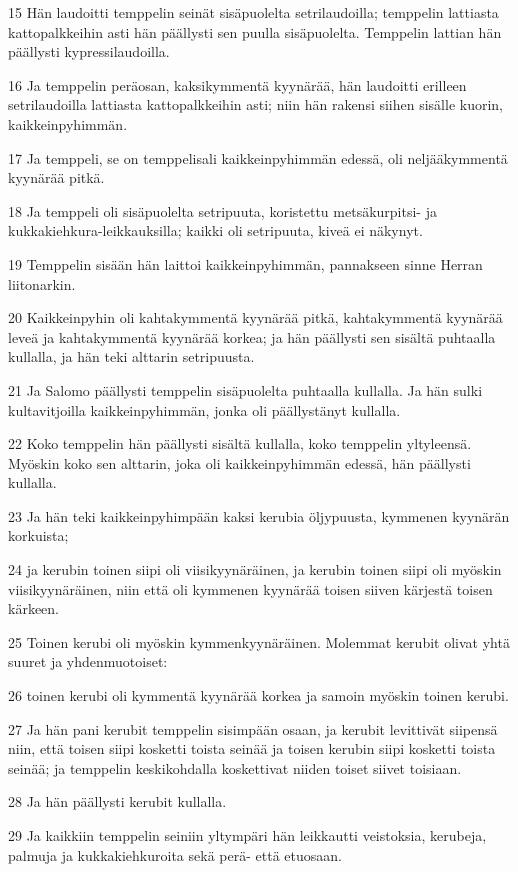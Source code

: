 \par 15 Hän laudoitti temppelin seinät sisäpuolelta setrilaudoilla; temppelin lattiasta kattopalkkeihin asti hän päällysti sen puulla sisäpuolelta. Temppelin lattian hän päällysti kypressilaudoilla.
\par 16 Ja temppelin peräosan, kaksikymmentä kyynärää, hän laudoitti erilleen setrilaudoilla lattiasta kattopalkkeihin asti; niin hän rakensi siihen sisälle kuorin, kaikkeinpyhimmän.
\par 17 Ja temppeli, se on temppelisali kaikkeinpyhimmän edessä, oli neljääkymmentä kyynärää pitkä.
\par 18 Ja temppeli oli sisäpuolelta setripuuta, koristettu metsäkurpitsi- ja kukkakiehkura-leikkauksilla; kaikki oli setripuuta, kiveä ei näkynyt.
\par 19 Temppelin sisään hän laittoi kaikkeinpyhimmän, pannakseen sinne Herran liitonarkin.
\par 20 Kaikkeinpyhin oli kahtakymmentä kyynärää pitkä, kahtakymmentä kyynärää leveä ja kahtakymmentä kyynärää korkea; ja hän päällysti sen sisältä puhtaalla kullalla, ja hän teki alttarin setripuusta.
\par 21 Ja Salomo päällysti temppelin sisäpuolelta puhtaalla kullalla. Ja hän sulki kultavitjoilla kaikkeinpyhimmän, jonka oli päällystänyt kullalla.
\par 22 Koko temppelin hän päällysti sisältä kullalla, koko temppelin yltyleensä. Myöskin koko sen alttarin, joka oli kaikkeinpyhimmän edessä, hän päällysti kullalla.
\par 23 Ja hän teki kaikkeinpyhimpään kaksi kerubia öljypuusta, kymmenen kyynärän korkuista;
\par 24 ja kerubin toinen siipi oli viisikyynäräinen, ja kerubin toinen siipi oli myöskin viisikyynäräinen, niin että oli kymmenen kyynärää toisen siiven kärjestä toisen kärkeen.
\par 25 Toinen kerubi oli myöskin kymmenkyynäräinen. Molemmat kerubit olivat yhtä suuret ja yhdenmuotoiset:
\par 26 toinen kerubi oli kymmentä kyynärää korkea ja samoin myöskin toinen kerubi.
\par 27 Ja hän pani kerubit temppelin sisimpään osaan, ja kerubit levittivät siipensä niin, että toisen siipi kosketti toista seinää ja toisen kerubin siipi kosketti toista seinää; ja temppelin keskikohdalla koskettivat niiden toiset siivet toisiaan.
\par 28 Ja hän päällysti kerubit kullalla.
\par 29 Ja kaikkiin temppelin seiniin yltympäri hän leikkautti veistoksia, kerubeja, palmuja ja kukkakiehkuroita sekä perä- että etuosaan.
